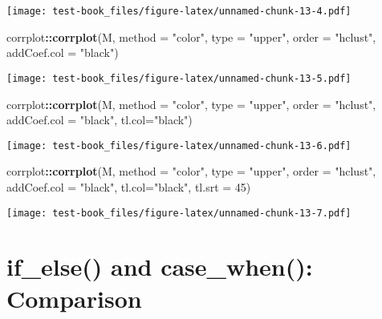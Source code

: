 \documentclass[]{book}
\newenvironment{Shaded}{\begin{snugshade}}{\end{snugshade}}
\newcommand{\DataTypeTok}[1]{\textcolor[rgb]{0.13,0.29,0.53}{#1}}
\newcommand{\DecValTok}[1]{\textcolor[rgb]{0.00,0.00,0.81}{#1}}
\newcommand{\KeywordTok}[1]{\textcolor[rgb]{0.13,0.29,0.53}{\textbf{#1}}}
\newcommand{\NormalTok}[1]{#1}
\newcommand{\OperatorTok}[1]{\textcolor[rgb]{0.81,0.36,0.00}{\textbf{#1}}}
\newcommand{\StringTok}[1]{\textcolor[rgb]{0.31,0.60,0.02}{#1}}
\begin{document}
\texttt{[image: test-book\_files/figure-latex/unnamed-chunk-13-4.pdf]}

\begin{Shaded}
\begin{Highlighting}[]
\NormalTok{corrplot}\OperatorTok{::}\KeywordTok{corrplot}\NormalTok{(M, }\DataTypeTok{method =} \StringTok{"color"}\NormalTok{, }\DataTypeTok{type =} \StringTok{"upper"}\NormalTok{, }\DataTypeTok{order =} \StringTok{"hclust"}\NormalTok{, }\DataTypeTok{addCoef.col =} \StringTok{"black"}\NormalTok{)}
\end{Highlighting}
\end{Shaded}

\texttt{[image: test-book\_files/figure-latex/unnamed-chunk-13-5.pdf]}

\begin{Shaded}
\begin{Highlighting}[]
\NormalTok{corrplot}\OperatorTok{::}\KeywordTok{corrplot}\NormalTok{(M, }\DataTypeTok{method =} \StringTok{"color"}\NormalTok{, }\DataTypeTok{type =} \StringTok{"upper"}\NormalTok{, }\DataTypeTok{order =} \StringTok{"hclust"}\NormalTok{, }\DataTypeTok{addCoef.col =} \StringTok{"black"}\NormalTok{, }\DataTypeTok{tl.col=}\StringTok{"black"}\NormalTok{)}
\end{Highlighting}
\end{Shaded}

\texttt{[image: test-book\_files/figure-latex/unnamed-chunk-13-6.pdf]}

\begin{Shaded}
\begin{Highlighting}[]
\NormalTok{corrplot}\OperatorTok{::}\KeywordTok{corrplot}\NormalTok{(M, }\DataTypeTok{method =} \StringTok{"color"}\NormalTok{, }\DataTypeTok{type =} \StringTok{"upper"}\NormalTok{, }\DataTypeTok{order =} \StringTok{"hclust"}\NormalTok{, }\DataTypeTok{addCoef.col =} \StringTok{"black"}\NormalTok{, }\DataTypeTok{tl.col=}\StringTok{"black"}\NormalTok{, }\DataTypeTok{tl.srt =} \DecValTok{45}\NormalTok{)}
\end{Highlighting}
\end{Shaded}

\texttt{[image: test-book\_files/figure-latex/unnamed-chunk-13-7.pdf]}

\hypertarget{if_else-and-case_when-comparison}{%
\chapter{if\_else() and case\_when(): Comparison}\label{if_else-and-case_when-comparison}}
\end{document}
